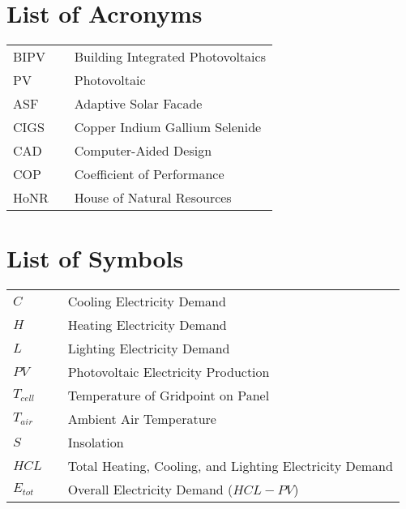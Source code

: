 


\chapter*{}

%


%
\tableofcontents \newpage

\listoffigures
{}
\newpage


\chapter*{List of Acronyms}
\begin{tabular}{lll}
BIPV	&&Building Integrated Photovoltaics\\
PV		&&Photovoltaic \\
ASF		&&Adaptive Solar Facade \\
CIGS	&&Copper Indium Gallium Selenide \\
CAD		&&Computer-Aided Design \\
COP		&&Coefficient of Performance \\
HoNR	&&House of Natural Resources \\

\end{tabular}

\chapter*{List of Symbols}
\begin{tabular}{lll}
$C$				&&Cooling Electricity Demand\\
$H$				&&Heating Electricity Demand\\
$L$				&&Lighting Electricity Demand\\
$PV$			&&Photovoltaic Electricity Production\\
$T_{cell}$		&&Temperature of Gridpoint on Panel\\
$T_{air}$		&&Ambient Air Temperature\\
$S$				&&Insolation\\
$HCL$			&&Total Heating, Cooling, and Lighting Electricity Demand\\
$E_{tot}$		&&Overall Electricity Demand ($HCL-PV$)\\

\end{tabular}
